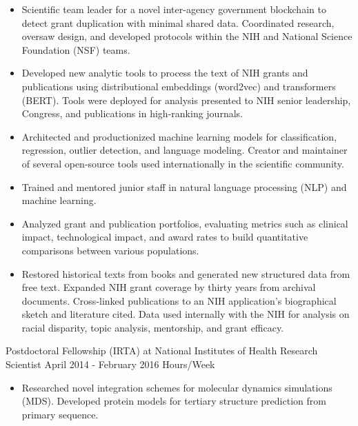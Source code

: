 \documentclass[]{scrartcl}
\begin{document}
\begin{cleanCV}
{\begin{itemize}
    \item Scientific team leader for a novel inter-agency government blockchain to detect grant duplication with minimal shared data. Coordinated research, oversaw design, and developed protocols within the NIH and National Science Foundation (NSF) teams.

    \item Developed new analytic tools to process the text of NIH grants and publications using distributional embeddings (word2vec) and transformers (BERT). Tools were deployed for analysis presented to NIH senior leadership, Congress, and publications in high-ranking journals.

    \item Architected and productionized machine learning models for classification, regression, outlier detection, and language modeling. Creator and maintainer of several open-source tools used internationally in the scientific community.

      \item Trained and mentored junior staff in natural language processing (NLP) and machine learning.
  
  \item Analyzed grant and publication portfolios, evaluating metrics such as clinical impact, technological impact, and award rates to build quantitative comparisons between various populations.
    
  \item Restored historical texts from books and generated new structured data from free text. Expanded NIH grant coverage by thirty years from archival documents. Cross-linked publications to an NIH application's biographical sketch and literature cited. Data used internally with the NIH for analysis on racial disparity, topic analysis, mentorship, and grant efficacy.    
    
  \end{itemize}
}

\vspace{0.5em}
 
\WorkExperience
{}
{Postdoctoral Fellowship (IRTA) at National Institutes of Health}
{\newline Research Scientist}
{
  \newline April 2014 - February 2016
   Hours/Week
}
{
  \begin{itemize}
  \item Researched novel integration schemes for molecular dynamics simulations (MDS). Developed protein models for tertiary structure prediction from primary sequence.


\end{itemize}}
\end{cleanCV}
\end{document}
